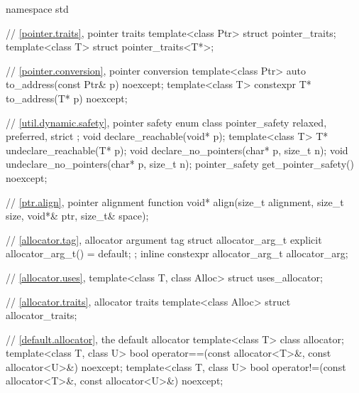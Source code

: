 %
\begin{codeblock}
namespace std {
  // \ref{pointer.traits}, pointer traits
  template<class Ptr> struct pointer_traits;
  template<class T> struct pointer_traits<T*>;

  // \ref{pointer.conversion}, pointer conversion
  template<class Ptr>
    auto to_address(const Ptr& p) noexcept;
  template<class T>
    constexpr T* to_address(T* p) noexcept;

  // \ref{util.dynamic.safety}, pointer safety
  enum class pointer_safety { relaxed, preferred, strict };
  void declare_reachable(void* p);
  template<class T>
    T* undeclare_reachable(T* p);
  void declare_no_pointers(char* p, size_t n);
  void undeclare_no_pointers(char* p, size_t n);
  pointer_safety get_pointer_safety() noexcept;

  // \ref{ptr.align}, pointer alignment function
  void* align(size_t alignment, size_t size, void*& ptr, size_t& space);

  // \ref{allocator.tag}, allocator argument tag
  struct allocator_arg_t { explicit allocator_arg_t() = default; };
  inline constexpr allocator_arg_t allocator_arg{};

  // \ref{allocator.uses}, 
  template<class T, class Alloc> struct uses_allocator;

  // \ref{allocator.traits}, allocator traits
  template<class Alloc> struct allocator_traits;

  // \ref{default.allocator}, the default allocator
  template<class T> class allocator;
  template<class T, class U>
    bool operator==(const allocator<T>&, const allocator<U>&) noexcept;
  template<class T, class U>
    bool operator!=(const allocator<T>&, const allocator<U>&) noexcept;

}
\end{codeblock}
